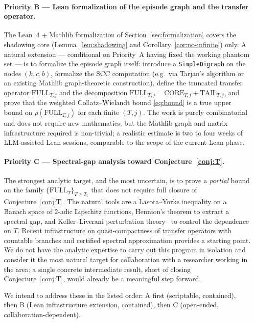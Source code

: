 \documentclass[11pt,a4paper]{article}
\theoremstyle{definition}
\newcommand{\full}{\mathrm{FULL}}
\newcommand{\core}{\mathrm{CORE}}
\newcommand{\tail}{\mathrm{TAIL}}
\newcommand{\spec}{\rho}
\begin{document}
\paragraph{Priority B --- Lean formalization of the episode graph
and the transfer operator.}
The Lean~4 + Mathlib formalization of
Section~\ref{sec:formalization} covers the shadowing core
(Lemma~\ref{lem:shadowing} and Corollary~\ref{cor:no-infinite})
only. A natural extension --- conditional on Priority~A having
fixed the working phantom set --- is to formalize the
episode graph itself: introduce a \texttt{SimpleDigraph} on the
nodes $(k, c, b)$, formalize the SCC computation (e.g.\ via
Tarjan's algorithm or an existing Mathlib graph-theoretic
construction), define the truncated transfer operator
$\full_{T,j}$ and the decomposition
$\full_{T,j} = \core_{T,j} + \tail_{T,j}$, and prove that the
weighted Collatz--Wielandt bound \eqref{eq:bound} is a true
upper bound on $\spec(\full_{T,j})$ for each finite $(T, j)$.
The work is purely combinatorial and does not require new
mathematics, but the Mathlib graph and matrix
infrastructure required is non-trivial; a realistic estimate is
two to four weeks of LLM-assisted Lean sessions, comparable to
the scope of the current Lean phase.

\paragraph{Priority C --- Spectral-gap analysis toward
Conjecture~\ref{conj:T}.}
The strongest analytic target, and the most uncertain, is to
prove a \emph{partial} bound on the family
$\{\full_T\}_{T \ge T_0}$ that does not require full closure of
Conjecture~\ref{conj:T}. The natural tools are a
Lasota--Yorke inequality on a Banach space of $2$-adic
Lipschitz functions, Hennion's theorem to extract a spectral
gap, and Keller--Liverani perturbation
theory~\cite{kellerliverani} to control the dependence on $T$.
Recent infrastructure on quasi-compactness of transfer
operators with countable branches \cite{quasicompact} and
certified spectral approximation \cite{certifiedspectral}
provides a starting point. We do not have the analytic
expertise to carry out this program in isolation and consider it
the most natural target for collaboration with a researcher
working in the area; a single concrete intermediate result,
short of closing Conjecture~\ref{conj:T}, would already be a
meaningful step forward.

We intend to address these in the listed order: A first
(scriptable, contained), then B (Lean infrastructure extension,
contained), then C (open-ended, collaboration-dependent).
\end{document}
